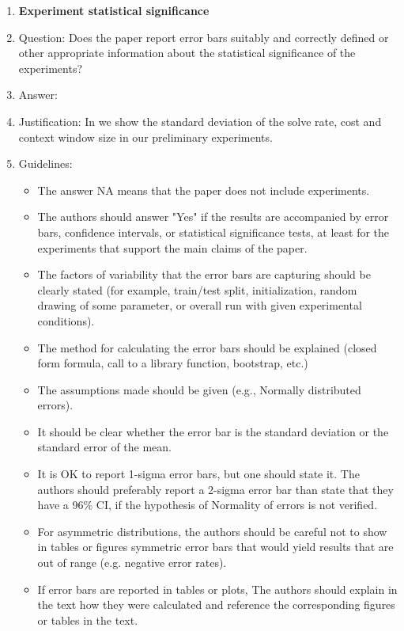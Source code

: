 \documentclass{article}
\begin{document}
\begin{enumerate}
\item {\bf Experiment statistical significance}
    \item[] Question: Does the paper report error bars suitably and correctly defined or other appropriate information about the statistical significance of the experiments?
    \item[] Answer: \answerYes{} %
    \item[] Justification: In  we show the standard deviation of the solve rate, cost and context window size in our preliminary experiments.
    \item[] Guidelines:
    \begin{itemize}
        \item The answer NA means that the paper does not include experiments.
        \item The authors should answer "Yes" if the results are accompanied by error bars, confidence intervals, or statistical significance tests, at least for the experiments that support the main claims of the paper.
        \item The factors of variability that the error bars are capturing should be clearly stated (for example, train/test split, initialization, random drawing of some parameter, or overall run with given experimental conditions).
        \item The method for calculating the error bars should be explained (closed form formula, call to a library function, bootstrap, etc.)
        \item The assumptions made should be given (e.g., Normally distributed errors).
        \item It should be clear whether the error bar is the standard deviation or the standard error of the mean.
        \item It is OK to report 1-sigma error bars, but one should state it. The authors should preferably report a 2-sigma error bar than state that they have a 96\% CI, if the hypothesis of Normality of errors is not verified.
        \item For asymmetric distributions, the authors should be careful not to show in tables or figures symmetric error bars that would yield results that are out of range (e.g. negative error rates).
        \item If error bars are reported in tables or plots, The authors should explain in the text how they were calculated and reference the corresponding figures or tables in the text.
    \end{itemize}


\end{enumerate}
\end{document}
